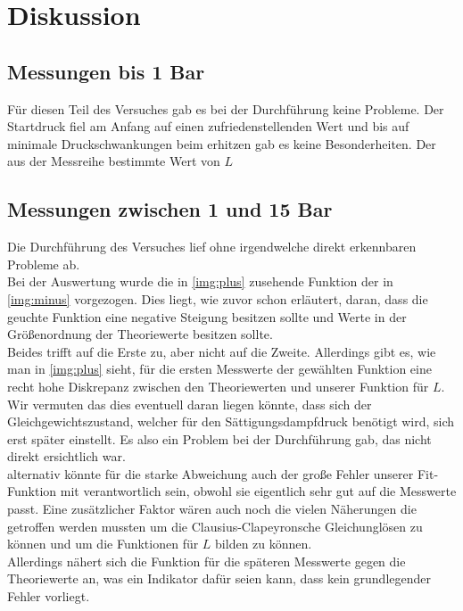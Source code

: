 \section{Diskussion}
\subsection{Messungen bis 1 Bar}

Für diesen Teil des Versuches gab es bei der Durchführung keine Probleme. Der Startdruck fiel am Anfang auf einen 
zufriedenstellenden Wert und bis auf minimale Druckschwankungen beim erhitzen gab es keine Besonderheiten.
Der aus der Messreihe bestimmte Wert von $L$


\subsection{Messungen zwischen 1 und 15 Bar}

Die Durchführung des Versuches lief ohne irgendwelche direkt erkennbaren Probleme ab.\\
Bei der Auswertung wurde die in \ref{img:plus} zusehende Funktion der in \ref{img:minus} vorgezogen.
Dies liegt, wie zuvor schon erläutert, daran, dass die geuchte Funktion eine negative Steigung besitzen sollte und Werte in der Größenordnung der Theoriewerte besitzen sollte.\\
Beides trifft auf die Erste zu, aber nicht auf die Zweite.
Allerdings gibt es, wie man in \ref{img:plus} sieht, für die ersten Messwerte der gewählten Funktion eine recht hohe Diskrepanz zwischen den Theoriewerten und unserer Funktion für $L$.
Wir vermuten das dies eventuell daran liegen könnte, dass sich der Gleichgewichtszustand, welcher für den Sättigungsdampfdruck benötigt wird, sich erst später einstellt.
Es also ein Problem bei der Durchführung gab, das nicht direkt ersichtlich war.\\
alternativ könnte für die starke Abweichung auch der große Fehler unserer Fit-Funktion mit verantwortlich sein, obwohl sie eigentlich sehr gut auf 
die Messwerte passt. Eine zusätzlicher Faktor wären auch noch die vielen Näherungen die getroffen werden mussten um die Clausius-Clapeyronsche Gleichunglösen zu können
und um die Funktionen für $L$ bilden zu können.\\
Allerdings nähert sich die Funktion für die späteren Messwerte gegen die Theoriewerte an, was ein Indikator dafür seien kann, dass kein grundlegender Fehler vorliegt.\\

